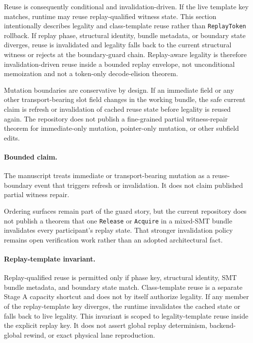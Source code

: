 \documentclass[twocolumn]{article}
\begin{document}
Reuse is consequently conditional and invalidation-driven. If the live template key matches, runtime may reuse replay-qualified witness state. This section intentionally describes legality and class-template reuse rather than \texttt{ReplayToken} rollback. If replay phase, structural identity, bundle metadata, or boundary state diverges, reuse is invalidated and legality falls back to the current structural witness or rejects at the boundary-guard chain. Replay-aware legality is therefore invalidation-driven reuse inside a bounded replay envelope, not unconditional memoization and not a token-only decode-elision theorem.

Mutation boundaries are conservative by design. If an immediate field or any other transport-bearing slot field changes in the working bundle, the safe current claim is refresh or invalidation of cached reuse state before legality is reused again. The repository does not publish a fine-grained partial witness-repair theorem for immediate-only mutation, pointer-only mutation, or other subfield edits.

\paragraph{Bounded claim.}
The manuscript treats immediate or transport-bearing mutation as a reuse-boundary event that triggers refresh or invalidation. It does not claim published partial witness repair.

Ordering surfaces remain part of the guard story, but the current repository does not publish a theorem that one \texttt{Release} or \texttt{Acquire} in a mixed-SMT bundle invalidates every participant's replay state. That stronger invalidation policy remains open verification work rather than an adopted architectural fact.

\paragraph{Replay-template invariant.}
Replay-qualified reuse is permitted only if phase key, structural identity, SMT bundle metadata, and boundary state match. Class-template reuse is a separate Stage A capacity shortcut and does not by itself authorize legality. If any member of the replay-template key diverges, the runtime invalidates the cached state or falls back to live legality. This invariant is scoped to legality-template reuse inside the explicit replay key. It does not assert global replay determinism, backend-global rewind, or exact physical lane reproduction.
\end{document}
